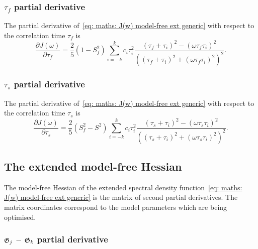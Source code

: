\subsubsection{$\tau_f$ partial derivative}

The partial derivative of~\eqref{eq: maths: J(w) model-free ext generic} with respect to the correlation time $\tau_f$ is
\begin{equation}
    \frac{\partial J(\omega)}{\partial \tau_f} = \frac{2}{5} (1 - S^2_f) \sum_{i=-k}^k c_i \tau_i^2
        \frac{(\tau_f + \tau_i)^2 - (\omega \tau_f \tau_i)^2}{\left((\tau_f + \tau_i)^2 + (\omega \tau_f \tau_i)^2 \right)^2}.
\end{equation}



\subsubsection{$\tau_s$ partial derivative}

The partial derivative of~\eqref{eq: maths: J(w) model-free ext generic} with respect to the correlation time $\tau_s$ is
\begin{equation}
    \frac{\partial J(\omega)}{\partial \tau_s} = \frac{2}{5} (S^2_f - S^2) \sum_{i=-k}^k c_i \tau_i^2
        \frac{(\tau_s + \tau_i)^2 - (\omega \tau_s \tau_i)^2}{\left((\tau_s + \tau_i)^2 + (\omega \tau_s \tau_i)^2 \right)^2}.
\end{equation}





\newpage
\subsection{The extended model-free Hessian}

The model-free Hessian of the extended spectral density function~\eqref{eq: maths: J(w) model-free ext generic} is the matrix of second partial derivatives.  The matrix coordinates correspond to the model parameters which are being optimised.



\subsubsection{$\mathfrak{G}_j$ -- $\mathfrak{G}_k$ partial derivative}

